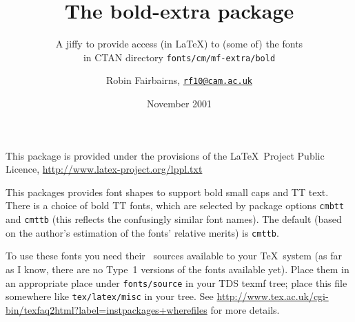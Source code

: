 \documentclass[DIV=9, pagesize=auto, version=last]{scrartcl}
\title{The \textsf{bold-extra} package}
\subtitle{A jiffy to provide access (in \LaTeX) to (some of) the fonts\\ in CTAN directory \texttt{fonts/cm/mf-extra/bold}}
\author{Robin Fairbairns, \href{mailto:rf10@cam.ac.uk}{\texttt{rf10@cam.ac.uk}}}
\date{November 2001}
\begin{document}
\maketitle

\noindent
This package is provided under the provisions of the \LaTeX\ Project
Public Licence, \url{http://www.latex-project.org/lppl.txt}

This packages provides font shapes to support bold small caps and TT
text.  There is a choice of bold TT fonts, which are selected by
package options \texttt{cmbtt} and \texttt{cmttb} (this reflects the confusingly
similar font names).  The default (based on the author's estimation
of the fonts' relative merits) is \texttt{cmttb}.

To use these fonts you need their \MF\ sources available to your
\TeX\ system (as far as I know, there are no Type~1 versions of the
fonts available yet).  Place them in an appropriate place under
\texttt{fonts/source} in your TDS \textsf{texmf} tree; place this file somewhere like
\texttt{tex/latex/misc} in your tree.  See
\url{http://www.tex.ac.uk/cgi-bin/texfaq2html?label=instpackages+wherefiles}
for more details.
\end{document}
